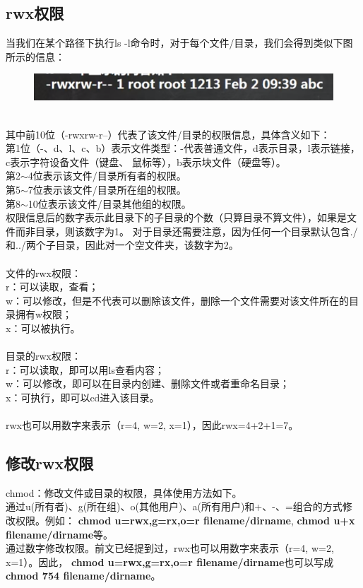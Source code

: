 \documentclass[11pt]{article}
\begin{document}
\subsection{rwx权限}
 当我们在某个路径下执行ls -l命令时，对于每个文件/目录，我们会得到类似下图所示的信息：
\begin{figure}[htb]
    \centering
    \includegraphics[scale=0.4]{imgs/rwx_info.png}
\end{figure}  \\
其中前10位（-rwxrw-r--）代表了该文件/目录的权限信息，具体含义如下：  \\
第1位（-、d、l、c、b）表示文件类型：-代表普通文件，d表示目录，l表示链接，c表示字符设备文件（键盘、
鼠标等），b表示块文件（硬盘等）。  \\
第2$\sim$4位表示该文件/目录所有者的权限。  \\
第5$\sim$7位表示该文件/目录所在组的权限。  \\
第8$\sim$10位表示该文件/目录其他组的权限。  \\
权限信息后的数字表示此目录下的子目录的个数（只算目录不算文件），如果是文件而非目录，则该数字为1。
对于目录还需要注意，因为任何一个目录默认包含./和../两个子目录，因此对一个空文件夹，该数字为2。\\\\
 文件的rwx权限：  \\
r：可以读取，查看；  \\
w：可以修改，但是不代表可以删除该文件，删除一个文件需要对该文件所在的目录拥有w权限；  \\
x：可以被执行。  \\\\
 目录的rwx权限：  \\
r：可以读取，即可以用ls查看内容；  \\
w：可以修改，即可以在目录内创建、删除文件或者重命名目录；  \\
x：可执行，即可以cd进入该目录。 \\\\
 rwx也可以用数字来表示（r=4, w=2, x=1），因此rwx=4+2+1=7。

\subsection{修改rwx权限}
chmod：修改文件或目录的权限，具体使用方法如下。  \\
 通过u(所有者)、g(所在组)、o(其他用户)、a(所有用户)和+、-、=组合的方式修改权限。例如：
\textbf{chmod u=rwx,g=rx,o=r filename/dirname}, \quad \textbf{chmod u+x filename/dirname}等。\\
 通过数字修改权限。前文已经提到过，rwx也可以用数字来表示（r=4, w=2, x=1）。因此，
\textbf{chmod u=rwx,g=rx,o=r filename/dirname}也可以写成 \textbf{chmod 754 filename/dirname}。
\end{document}
